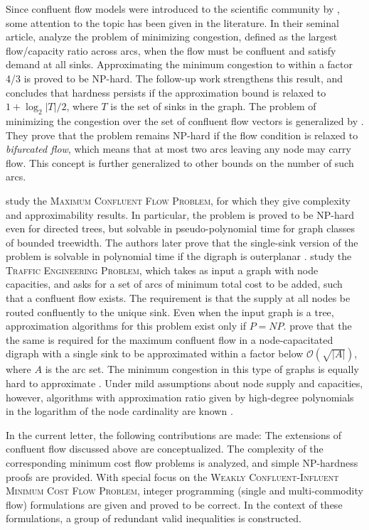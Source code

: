 \documentclass[pdflatex,sn-mathphys-num]{sn-jnl}%
\theoremstyle{thmstyleone}%
\begin{document}
Since confluent flow models were introduced to the scientific community by \citet{chen2006merge,chen2007confluent}, some attention to the topic has been given in the literature.
In their seminal article, \citet{chen2006merge} analyze the problem of minimizing congestion, defined as the largest flow/capacity ratio across arcs,
when the flow must be confluent and satisfy demand at all sinks.
Approximating the minimum congestion to within a factor 4/3 is proved to be NP-hard.
The follow-up work \citep{chen2007confluent} strengthens this result, and concludes that hardness persists if the approximation bound is relaxed to $1+\log_2{|T|}/2$,
where $T$ is the set of sinks in the graph.
The problem of minimizing the congestion over the set of confluent flow vectors is generalized by \citet{donovan2007degreeconstrained}.
They prove that the problem remains NP-hard if the flow condition is relaxed to \emph{bifurcated flow}, which means that at most two arcs leaving any node may carry flow.
This concept is further generalized to other bounds on the number of such arcs.

\citet{dressler2010confluent} study the \textsc{Maximum Confluent Flow Problem}, for which they give complexity and approximability results.
In particular, the problem is proved to be NP-hard even for directed trees, but solvable in pseudo-polynomial time for graph classes of bounded treewidth.
The authors later prove that the single-sink version of the problem is solvable in polynomial time if the digraph is outerplanar \citep{dressler2014polynomial}.
\citet{bhatia2008traffic} study the \textsc{Traffic Engineering Problem}, which takes as input a graph with node capacities, and asks for a set of arcs of minimum total cost to be added, such that a confluent flow exists.
The requirement is that the supply at all nodes be routed confluently to the unique sink.
Even when the input graph is a tree, approximation algorithms for this problem exist only if $P=NP$.
\citet{shepherd2017inapprox} prove that the the same is required for the maximum confluent flow in a node-capacitated digraph with a single sink to be approximated within a factor below $\mathcal{O}(\sqrt{|A|})$, where $A$ is the arc set.
The minimum congestion in this type of graphs is equally hard to approximate \cite{shepherd2017inapprox}. Under mild assumptions about node supply and capacities, however, algorithms with approximation ratio given by high-degree polynomials in the logarithm of the node cardinality are known \cite{shepherd2015poly}.

In the current letter, the following contributions are made: The extensions of confluent flow discussed above are conceptualized.
The complexity of the corresponding minimum cost flow problems is analyzed, and simple NP-hardness proofs are provided.
With special focus on the \textsc{Weakly Confluent-Influent Minimum Cost Flow Problem}, integer programming (single and multi-commodity flow) formulations are given and proved to be correct.
In the context of these formulations, a group of redundant valid inequalities is constructed.
\end{document}
